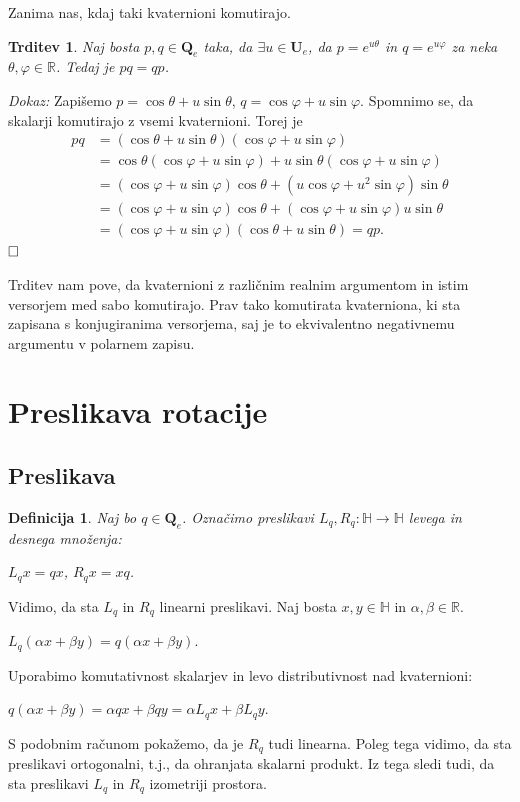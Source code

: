 \documentclass[a4paper,12pt]{article}
\def\R{\mathbb{R}} %
\def\H{\mathbb{H}} %
\def\Qe{\textbf{Q}_{e}} %
\def\Ue{\textbf{U}_{e}} %
\def\qed{$\hfill\Box$}   %
\newtheorem{trditev}{Trditev}
\newtheorem{definicija}{Definicija}
\begin{document}
Zanima nas, kdaj taki kvaternioni komutirajo.
\begin{trditev}
Naj bosta $p,q \in \Qe$ taka, da $\exists u \in \Ue$, da $p = e^{u\theta}$ in $q = e^{u\varphi}$ za neka $\theta, \varphi \in \R$.
Tedaj je $pq = qp$.
\end{trditev}
\noindent
{\em Dokaz:\/} Zapišemo $p = \cos\theta + u\sin\theta$, $q = \cos\varphi + u\sin\varphi$.
Spomnimo se, da skalarji komutirajo z vsemi kvaternioni. Torej je
\begin{align*}
   pq & = (\cos\theta + u\sin\theta)(\cos\varphi + u\sin\varphi)\\
   & = \cos\theta(\cos\varphi + u\sin\varphi) + u\sin\theta(\cos\varphi + u\sin\varphi)\\
   & = (\cos\varphi + u\sin\varphi)\cos\theta + (u\cos\varphi + u^2\sin\varphi)\sin\theta\\
   & = (\cos\varphi + u\sin\varphi)\cos\theta + (\cos\varphi + u\sin\varphi)u\sin\theta\\
   & = (\cos\varphi + u\sin\varphi)(\cos\theta + u\sin\theta) = qp.
\end{align*}
\qed

Trditev nam pove, da kvaternioni z različnim realnim argumentom in istim versorjem med sabo komutirajo.
Prav tako komutirata kvaterniona, ki sta zapisana s konjugiranima versorjema, saj je to ekvivalentno negativnemu argumentu v polarnem zapisu.

\section{Preslikava rotacije}
\subsection{Preslikava}
\begin{definicija}
Naj bo $q \in \Qe$. Označimo preslikavi $L_{q}, R_{q} : \H \to \H$ levega in desnega množenja:
\begin{center}
   $L_{q}x = qx$, $R_{q}x = xq$.
\end{center}
\end{definicija}

\noindent Vidimo, da sta $L_{q}$ in $R_{q}$ linearni preslikavi. Naj bosta $x,y \in \H$ in $\alpha, \beta \in \R$.
\begin{center}
   $L_{q}(\alpha x +\beta y) = q(\alpha x +\beta y)$.
\end{center}
Uporabimo komutativnost skalarjev in levo distributivnost nad kvaternioni:
\begin{center}
   $q(\alpha x +\beta y) = \alpha qx + \beta qy = \alpha L_{q}x + \beta L_{q}y$.
\end{center}
S podobnim računom pokažemo, da je $R_{q}$ tudi linearna. Poleg tega vidimo, da sta preslikavi ortogonalni,
t.j., da ohranjata skalarni produkt. Iz tega sledi tudi, da sta preslikavi $L_{q}$ in $R_{q}$ izometriji prostora.
\end{document}
